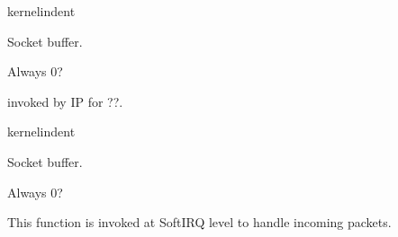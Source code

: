 \documentclass[letterpaper,10pt,english]{sphinxmanual}
\begin{document}
\begin{sphinxuseclass}{kernelindent}
\sphinxAtStartPar
{}
\begin{description}
\sphinxAtStartPar
Socket buffer.

\end{description}

\sphinxAtStartPar
{}

\sphinxAtStartPar
Always 0?

\end{sphinxuseclass}

\begin{fulllineitems}
\label{\detokenize{mtpimpl.c:c.MTP_v4_early_demux_handler}}
\pysigstartsignatures
\pysigstartmultiline
{}
\pysigstopmultiline
\pysigstopsignatures
\sphinxAtStartPar
invoked by IP for ??.

\end{fulllineitems}


\begin{sphinxuseclass}{kernelindent}
\sphinxAtStartPar
{}
\begin{description}
\sphinxAtStartPar
Socket buffer.

\end{description}

\sphinxAtStartPar
{}

\sphinxAtStartPar
Always 0?

\end{sphinxuseclass}

\begin{fulllineitems}
\label{\detokenize{mtpimpl.c:c.MTP_softirq}}
\pysigstartsignatures
\pysigstartmultiline
{}
\pysigstopmultiline
\pysigstopsignatures
\sphinxAtStartPar
This function is invoked at SoftIRQ level to handle incoming packets.

\end{fulllineitems}
\end{document}
